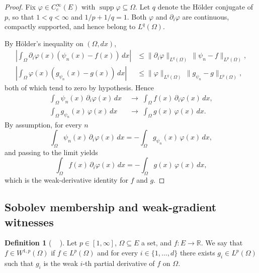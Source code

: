 \documentclass[11pt]{amsart}
\newcommand{\R}{\mathbb{R}}
\DeclareMathOperator{\supp}{supp}
\newcommand{\Lp}[1]{L^{#1}}
\newcommand{\Wkp}[2]{W^{#1,#2}}
\newcommand{\leanname}[1]{%
  \begingroup
  \textnormal{\small\texttt{%
    \let\oldunderscore\_%
    \def\_{\oldunderscore\discretionary{}{}{}}%
    \seqsplit{#1}}}%
  \endgroup}
\theoremstyle{definition}
\newtheorem{definition}[theorem]{Definition}
\theoremstyle{remark}
\begin{document}
\begin{proof}
Fix $\varphi \in C_c^\infty(E)$ with $\supp\varphi \subseteq \Omega$. Let $q$
denote the H{\"o}lder conjugate of $p$, so that $1 < q < \infty$ and $1/p + 1/q
= 1$. Both $\varphi$ and $\partial_i\varphi$ are continuous, compactly
supported, and hence belong to $\Lp{q}(\Omega)$.

By H{\"o}lder's inequality on $(\Omega, dx)$,
\begin{align*}
  \left| \int_\Omega \partial_i\varphi(x) (\psi_n(x) - f(x))\,dx \right|
  &\le \|\partial_i\varphi\|_{\Lp{q}(\Omega)}\,\|\psi_n - f\|_{\Lp{p}(\Omega)},\\
  \left| \int_\Omega \varphi(x) (g_{\psi_n}(x) - g(x))\,dx \right|
  &\le \|\varphi\|_{\Lp{q}(\Omega)}\,\|g_{\psi_n} - g\|_{\Lp{p}(\Omega)},
\end{align*}
both of which tend to zero by hypothesis. Hence
\begin{align*}
  \int_\Omega \psi_n(x)\,\partial_i\varphi(x)\,dx
    &\;\to\; \int_\Omega f(x)\,\partial_i\varphi(x)\,dx, \\
  \int_\Omega g_{\psi_n}(x)\,\varphi(x)\,dx
    &\;\to\; \int_\Omega g(x)\,\varphi(x)\,dx.
\end{align*}
By assumption, for every $n$
\begin{equation*}
  \int_\Omega \psi_n(x)\,\partial_i\varphi(x)\,dx
    = -\int_\Omega g_{\psi_n}(x)\,\varphi(x)\,dx,
\end{equation*}
and passing to the limit yields
\begin{equation*}
  \int_\Omega f(x)\,\partial_i\varphi(x)\,dx
    = -\int_\Omega g(x)\,\varphi(x)\,dx,
\end{equation*}
which is the weak-derivative identity for $f$ and $g$.
\end{proof}

\subsection{Sobolev membership and weak-gradient witnesses}

\begin{definition}[\leanname{DeGiorgi.MemW1p}]\label{def:MemW1p}
Let $p \in [1,\infty]$, $\Omega \subseteq E$ a set, and $f : E \to \R$. We say
that $f \in \Wkp{1}{p}(\Omega)$ if $f \in \Lp{p}(\Omega)$ and for every $i \in
\{1,\ldots,d\}$ there exists $g_i \in \Lp{p}(\Omega)$ such that $g_i$ is the
weak $i$-th partial derivative of $f$ on $\Omega$.
\end{definition}
\end{document}
